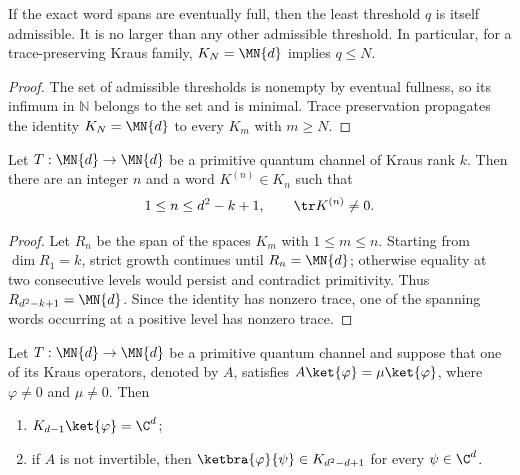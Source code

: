 \begin{lemma}
    \label{lem:wolf_wielandt_index_minimal}
    \leanok
    If the exact word spans are eventually full, then the least threshold
    $q$ is itself admissible. It is no larger than any other admissible
    threshold. In particular, for a trace-preserving Kraus family,
    $K_N=\MN{d}$ implies $q\leq N$.
\end{lemma}

\begin{proof}\leanok
    The set of admissible thresholds is nonempty by eventual fullness, so its
    infimum in $\mathbb N$ belongs to the set and is minimal. Trace preservation
    propagates the identity $K_N=\MN{d}$ to every $K_m$ with $m\geq N$.
\end{proof}

\begin{lemma}
    \label{lem:wolf_6_2_nonzero_trace_word}
    \leanok
    Let $T:\MN{d}\to\MN{d}$ be a primitive quantum channel of Kraus rank
    $k$. Then there are an integer $n$ and a word $K^{(n)}\in K_n$ such that
    \begin{align}
        1\leq n\leq d^2-k+1,
        \qquad
        \tr K^{(n)}\neq0.
        \notag
    \end{align}
\end{lemma}

\begin{proof}\leanok
    Let $R_n$ be the span of the spaces $K_m$ with $1\leq m\leq n$.
    Starting from $\dim R_1=k$, strict growth continues until $R_n=\MN{d}$;
    otherwise equality at two consecutive levels would persist and contradict
    primitivity. Thus $R_{d^2-k+1}=\MN{d}$. Since the identity has nonzero
    trace, one of the spanning words occurring at a positive level has
    nonzero trace.
\end{proof}

\begin{lemma}
    \label{lem:wolf_6_3_eigenvector_spreading}
    \leanok
    Let $T:\MN{d}\to\MN{d}$ be a primitive quantum channel and suppose that
    one of its Kraus operators, denoted by $A$, satisfies
    $A\ket{\varphi}=\mu\ket{\varphi}$, where
    $\varphi\neq0$ and $\mu\neq0$. Then
    \begin{enumerate}
        \item $K_{d-1}\ket{\varphi}=\C^d$;
        \item if $A$ is not invertible, then
            $\ketbra{\varphi}{\psi}\in K_{d^2-d+1}$ for every
            $\psi\in\C^d$.
    \end{enumerate}
\end{lemma}

